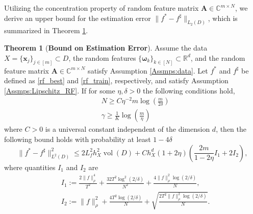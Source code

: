\documentclass[11pt,twoside]{article}
\theoremstyle{plain}
\theoremstyle{definition}
\newtheorem{theorem}[lemma]{Theorem}
\theoremstyle{remark}
\newcommand{\R}{\mathbb{R}}
\newcommand{\C}{\mathbb{C}}
\newcommand{\Ab}{\mathbf{A}}
\newcommand{\xb}{\mathbf{x}}
\newcommand{\vol}{\mathop{\mathrm{vol}}}
\newcommand{\omegab}{\boldsymbol\omega}
\begin{document}
Utilizing the concentration property of random feature matrix $\Ab\in\C^{m\times N}$, we derive an upper bound for the estimation error $\|f^* - f^\sharp\|_{L_2(D)}$, which is summarized in Theorem \ref{rf_term2}. 
\begin{theorem}[{\bf Bound on Estimation Error}]
\label{rf_term2}
Assume the data $X = \{\xb_j\}_{j\in[m]} \subset D$, the random features $\{ \omegab_k\}_{k\in[N]} \subset\R^d$, and the random feature matrix $\Ab\in\C^{m\times N}$ satisfy Assumption \ref{Assmps:data}.
Let $f^*$ and $f^\sharp$ be defined as \eqref{rf_best} and \eqref{rf_train}, respectively, and satisfy Assumption \ref{Assmps:Lipschitz_RF}. If for some $\eta,\delta>0$ the following conditions hold, 
\begin{align}
& N \geq C\eta^{-2}m\log(\frac{m}{2\delta}) \\
& \gamma \geq \frac{1}{K}\log(\frac{m}{\eta})
\end{align}
where $C>0$ is a universal constant independent of the dimension $d$, then the following bound holds with probability at least $1-4\delta$
\begin{equation}
\|f^* - f^\sharp\|^2_{L^2(D)} \leq 2L_f^2h_X^2\vol(D) + Ch_X^d(1+2\eta)\left( \frac{2m}{1-2\eta}I_1 + 2I_2 \right),
\end{equation}
where quantities $I_1$ and $I_2$ are 
\begin{equation*}
\begin{aligned}
&I_1 := \frac{2\|f\|_\rho^4}{T^2} + \frac{32T^2\log^2(2/\delta)}{N^2} + \frac{4\|f\|^2_\rho\log(2/\delta)}{N}, \\
&I_2 := \|f\|_\rho^2 + \frac{4T^2\log(2/\delta)}{N} + \sqrt{\frac{2T^2\|f\|_\rho^2\log(2/\delta)}{N}}.
\end{aligned}
\end{equation*}
\end{theorem}
\end{document}
